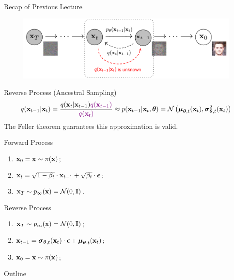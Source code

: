 \documentclass{beamer}
\begin{document}
\begin{frame}{Recap of Previous Lecture}
    \vspace{-0.3cm}
    \begin{figure}
        \includegraphics[width=0.8\linewidth]{figs/DDPM}
    \end{figure}
    \vspace{-0.5cm}
    \begin{block}{Reverse Process (Ancestral Sampling)}
        \vspace{-0.5cm}
        {\small
        \[
            q(\mathbf{x}_{t-1}|\mathbf{x}_{t}) = \frac{q(\mathbf{x}_{t}|\mathbf{x}_{t-1}) {\color{violet}q(\mathbf{x}_{t-1})}}{{\color{violet}q(\mathbf{x}_{t})}} \approx p(\mathbf{x}_{t - 1} | \mathbf{x}_t, \boldsymbol{\theta}) = \mathcal{N} \left(\boldsymbol{\mu}_{\boldsymbol{\theta}, t}(\mathbf{x}_t), \boldsymbol{\sigma}_{\boldsymbol{\theta}, t}^2(\mathbf{x}_t)\right)
        \]}
        {\color{gray}The Feller theorem guarantees this approximation is valid.}
    \end{block}
    \begin{minipage}{0.5\linewidth}
        \begin{block}{Forward Process}
            \begin{enumerate}
                \item $\mathbf{x}_0 = \mathbf{x} \sim \pi(\mathbf{x})$;
                \item $\mathbf{x}_t = \sqrt{1 - \beta_t} \cdot \mathbf{x}_{t - 1} + \sqrt{\beta_t} \cdot \boldsymbol{\epsilon}$;
                \item $\mathbf{x}_T \sim p_{\infty}(\mathbf{x}) = \mathcal{N}(0, \mathbf{I})$.
            \end{enumerate}
        \end{block}
    \end{minipage}%
    \begin{minipage}{0.55\linewidth}
        \begin{block}{Reverse Process}
            \begin{enumerate}
                \item $\mathbf{x}_T \sim p_{\infty}(\mathbf{x}) = \mathcal{N}(0, \mathbf{I})$;
                \item $\mathbf{x}_{t - 1} = \boldsymbol{\sigma}_{\boldsymbol{\theta}, t}(\mathbf{x}_t) \cdot \boldsymbol{\epsilon} + \boldsymbol{\mu}_{\boldsymbol{\theta}, t}(\mathbf{x}_t)$;
                \item $\mathbf{x}_0 = \mathbf{x} \sim \pi(\mathbf{x})$;
            \end{enumerate}
        \end{block}
    \end{minipage}
\end{frame}
\begin{frame}{Outline}
    \tableofcontents
\end{frame}
\end{document}
